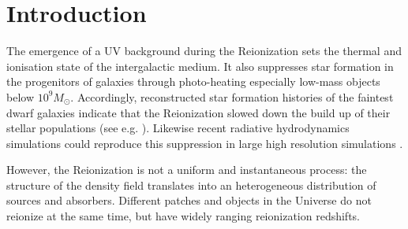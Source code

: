 \documentclass[twocolumn]{aastex61}
\begin{document}



\section{Introduction}
The emergence of a UV background during the Reionization sets the thermal and ionisation state of the intergalactic medium. It also suppresses star formation in the progenitors of galaxies through photo-heating especially low-mass objects below $10^9 M_\odot$. Accordingly, reconstructed star formation histories of the faintest dwarf galaxies indicate that the Reionization slowed down the build up of their stellar populations (see e.g. \citet{BROWN14}). Likewise recent radiative hydrodynamics simulations could reproduce this suppression in large high resolution simulations \citep{OCV16}. 

However, the Reionization is not a uniform and instantaneous process: the structure of the density field translates into an heterogeneous distribution of sources and absorbers. Different patches and objects in the Universe do not reionize at the same time, but have widely ranging reionization redshifts. 
\end{document}
